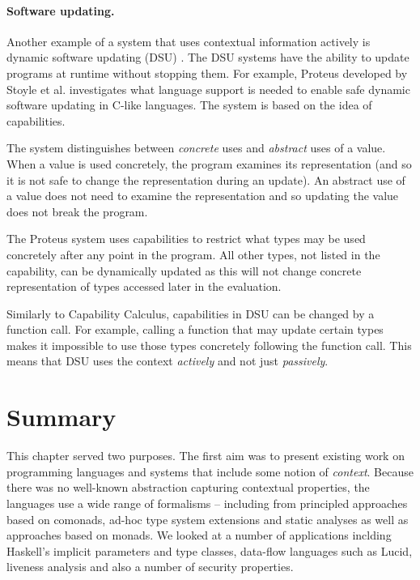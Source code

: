 
\paragraph{Software updating.}
Another example of a system that uses contextual information actively is dynamic software updating 
(DSU) \cite{app-dsu-programs,app-dsu}. The DSU systems have the ability to update programs at
runtime without stopping them. For example, Proteus developed by Stoyle et al. \cite{app-dsu-mutatis} 
investigates what language support is needed to enable safe dynamic software updating in C-like 
languages. The system is based on the idea of capabilities.

The system distinguishes between \emph{concrete} uses and \emph{abstract} uses of a value. When
a value is used concretely, the program examines its representation (and so it is not safe to
change the representation during an update). An abstract use of a value does not need to examine
the representation and so updating the value does not break the program.

The Proteus system uses capabilities to restrict what types may be used concretely after any point
in the program. All other types, not listed in the capability, can be dynamically updated as this
will not change concrete representation of types accessed later in the evaluation.

Similarly to Capability Calculus, capabilities in DSU can be changed by a function call. For 
example, calling a function that may update certain types makes it impossible to use those types
concretely following the function call. This means that DSU uses the context \emph{actively}
and not just \emph{passively}.


\section{Summary}

This chapter served two purposes. The first aim was to present existing work on programming 
languages and systems that include some notion of \emph{context}. Because there was no well-known
abstraction capturing contextual properties, the languages use a wide range of formalisms -- including
from principled approaches based on comonads, ad-hoc type system extensions and static analyses as
well as approaches based on monads. We looked at a number of applications inclding Haskell's implicit 
parameters and type classes, data-flow languages such as Lucid, liveness analysis and also a number of 
security properties. 

